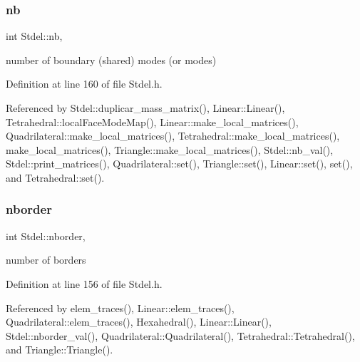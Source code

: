 \mbox{\label{classStdel_ad1d9acc38335d3fd779ba5c14f1507f8}} 
\subsubsection{\texorpdfstring{nb}{nb}}
{\footnotesize\ttfamily int Stdel\+::nb\hspace{0.3cm}{\ttfamily [protected]}, {\ttfamily [inherited]}}



number of boundary (shared) modes (or modes) 



Definition at line 160 of file Stdel.\+h.



Referenced by Stdel\+::duplicar\+\_\+mass\+\_\+matrix(), Linear\+::\+Linear(), Tetrahedral\+::local\+Face\+Mode\+Map(), Linear\+::make\+\_\+local\+\_\+matrices(), Quadrilateral\+::make\+\_\+local\+\_\+matrices(), Tetrahedral\+::make\+\_\+local\+\_\+matrices(), make\+\_\+local\+\_\+matrices(), Triangle\+::make\+\_\+local\+\_\+matrices(), Stdel\+::nb\+\_\+val(), Stdel\+::print\+\_\+matrices(), Quadrilateral\+::set(), Triangle\+::set(), Linear\+::set(), set(), and Tetrahedral\+::set().

\mbox{\label{classStdel_ad0f111a2ba3d9415618c8408da3fc100}} 
\subsubsection{\texorpdfstring{nborder}{nborder}}
{\footnotesize\ttfamily int Stdel\+::nborder\hspace{0.3cm}{\ttfamily [protected]}, {\ttfamily [inherited]}}



number of borders 



Definition at line 156 of file Stdel.\+h.



Referenced by elem\+\_\+traces(), Linear\+::elem\+\_\+traces(), Quadrilateral\+::elem\+\_\+traces(), Hexahedral(), Linear\+::\+Linear(), Stdel\+::nborder\+\_\+val(), Quadrilateral\+::\+Quadrilateral(), Tetrahedral\+::\+Tetrahedral(), and Triangle\+::\+Triangle().

